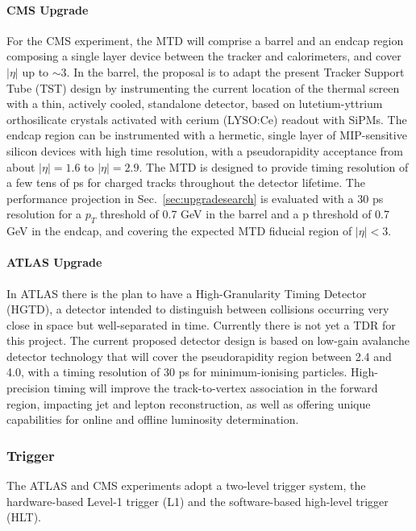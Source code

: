 \paragraph{CMS Upgrade} 
For the CMS experiment, the MTD will comprise a barrel and an endcap region composing a single layer device between the tracker and calorimeters, and cover $|\eta|$ up to $\sim3$. 
In the barrel, the proposal is to adapt the present Tracker Support Tube (TST) design by instrumenting the current location of the thermal screen with a thin, actively cooled, standalone detector, based on lutetium-yttrium orthosilicate crystals activated with cerium (LYSO:Ce) readout with SiPMs.
The endcap region can be instrumented with a hermetic, single layer of MIP-sensitive silicon devices with high time resolution, with a pseudorapidity acceptance from about $|\eta|=1.6$ to $|\eta|=2.9$.
The MTD is designed to provide timing resolution of a few tens of ps for charged tracks throughout the detector lifetime. 
The performance projection in Sec.~\ref{sec:upgradesearch} is evaluated with a 30 ps resolution for a $p_T$ threshold of 0.7 GeV in the barrel and a p threshold of 0.7 GeV in the endcap, and covering the expected MTD fiducial region of $|\eta| < 3$.

\paragraph{ATLAS Upgrade}
In ATLAS  there is the plan to have a High-Granularity Timing Detector (HGTD),
a detector intended to distinguish between collisions occurring very close in space but
well-separated in time. Currently there is not yet a TDR for this project.
The current proposed detector design is based on low-gain avalanche
detector technology that will cover the pseudorapidity region between 2.4 and 4.0,
with a timing resolution of 30 ps for minimum-ionising particles. High-precision timing
will improve the track-to-vertex association in the forward region, impacting jet and lepton
reconstruction, as well as offering unique capabilities for online and offline luminosity determination.


\subsubsection{Trigger} \label{sec:upgradetrigger}

The ATLAS and CMS experiments adopt a two-level trigger system, the hardware-based Level-1 trigger (L1) and the software-based high-level trigger (HLT). 

